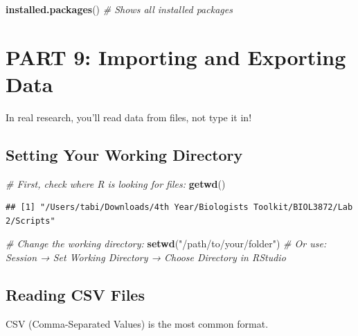 \documentclass[
]{article}
\newenvironment{Shaded}{\begin{snugshade}}{\end{snugshade}}
\newcommand{\CommentTok}[1]{\textcolor[rgb]{0.56,0.35,0.01}{\textit{#1}}}
\newcommand{\FunctionTok}[1]{\textcolor[rgb]{0.13,0.29,0.53}{\textbf{#1}}}
\newcommand{\NormalTok}[1]{#1}
\newcommand{\StringTok}[1]{\textcolor[rgb]{0.31,0.60,0.02}{#1}}
\begin{document}
\begin{Shaded}
\begin{Highlighting}[]
\FunctionTok{installed.packages}\NormalTok{()   }\CommentTok{\# Shows all installed packages}
\end{Highlighting}
\end{Shaded}

\section{PART 9: Importing and Exporting
Data}\label{part-9-importing-and-exporting-data}

In real research, you'll read data from files, not type it in!

\subsection{Setting Your Working
Directory}\label{setting-your-working-directory}

\begin{Shaded}
\begin{Highlighting}[]
\CommentTok{\# First, check where R is looking for files:}
\FunctionTok{getwd}\NormalTok{()}
\end{Highlighting}
\end{Shaded}

\begin{verbatim}
## [1] "/Users/tabi/Downloads/4th Year/Biologists Toolkit/BIOL3872/Lab 2/Scripts"
\end{verbatim}

\begin{Shaded}
\begin{Highlighting}[]
\CommentTok{\# Change the working directory:}
\FunctionTok{setwd}\NormalTok{(}\StringTok{"/path/to/your/folder"}\NormalTok{)}
\CommentTok{\# Or use: Session → Set Working Directory → Choose Directory in RStudio}
\end{Highlighting}
\end{Shaded}

\subsection{Reading CSV Files}\label{reading-csv-files}

CSV (Comma-Separated Values) is the most common format.
\end{document}
